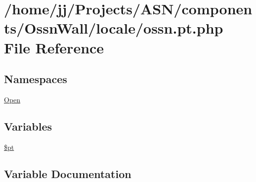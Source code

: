 \hypertarget{components_2_ossn_wall_2locale_2ossn_8pt_8php}{}\section{/home/jj/\+Projects/\+A\+S\+N/components/\+Ossn\+Wall/locale/ossn.pt.\+php File Reference}
\label{components_2_ossn_wall_2locale_2ossn_8pt_8php}
\subsection*{Namespaces}
\begin{DoxyCompactItemize}
\item 
 \hyperlink{namespace_open}{Open}
\end{DoxyCompactItemize}
\subsection*{Variables}
\begin{DoxyCompactItemize}
\item 
\hyperlink{components_2_ossn_wall_2locale_2ossn_8pt_8php_a62c150775a7a00e8663463c638016cad}{\$pt}
\end{DoxyCompactItemize}


\subsection{Variable Documentation}
